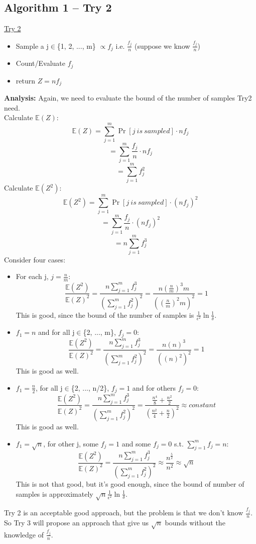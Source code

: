 \documentclass[11pt]{article}
\begin{document}
\subsection{Algorithm 1 -- Try 2}
\begin{mdframed}[backgroundcolor=blue!05,topline=false,bottomline=false,leftline=false,rightline=false] 
	\underline{\sc Try 2}
	\begin{itemize}
		\item Sample a j$\in$\{1, 2, ..., m\} $\propto f_j$ i.e. $\frac{f_j}{n}$ (suppose we know $\frac{f_j}{n}$)
		\item Count/Evaluate $f_j$
		\item return $Z=nf_j$
	\end{itemize}
\end{mdframed}
\textbf{Analysis:} Again, we need to evaluate the bound of the number of samples Try2 need.\\
Calculate $\mathbb{E}(Z)$:
$$\mathbb{E}{(Z)} = \sum_{j=1}^m\Pr[j\ is\ sampled]\cdot nf_j$$
$$= \sum_{j=1}^m \frac{f_j}{n}\cdot nf_j$$
$$= \sum_{j=1}^m f_j^2$$
Calculate $\mathbb{E}(Z^2)$:
$$\mathbb{E}(Z^2)=\sum_{j=1}^m\Pr[j\ is\ sampled]\cdot (nf_j)^2$$
$$= \sum_{j=1}^m \frac{f_j}{n} \cdot (nf_j)^2$$
$$=n\sum_{j=1}^m f_j^3$$
Consider four cases:
\begin{itemize}
    \item For each j, $j =\frac{n}{m}$:
    $$\frac{\mathbb{E}(Z^2)}{\mathbb{E}(Z)^2} = \frac{n\sum_{j=1}^m f_j^3}{(\sum_{j=1}^m f_j^2)^2} = \frac{n(\frac{n}{m})^3m}{((\frac{n}{m})^2 m)^2} = 1$$
    This is good, since the bound of the number of samples is $\frac{1}{\epsilon^2}\ln{\frac{1}{\delta}} $.
    
    \item $f_1=n$ and for all j$\in$\{2, ..., m\}, $f_j=0$:
    $$\frac{\mathbb{E}(Z^2)}{\mathbb{E}(Z)^2} = \frac{n\sum_{j=1}^m f_j^3}{(\sum_{j=1}^m f_j^2)^2} = \frac{n(n)^3}{((n)^2)^2} = 1$$
    This is good as well.
    
    \item $f_1=\frac{n}{2}$, for all j$\in$\{2, ..., n/2\}, $f_j=1$ and for others $f_j=0$:
    $$\frac{\mathbb{E}(Z^2)}{\mathbb{E}(Z)^2} = \frac{n\sum_{j=1}^m f_j^3}{(\sum_{j=1}^m f_j^2)^2} = \frac{\frac{n^4}{8}+\frac{n^2}{2}}{(\frac{n^2}{4}+\frac{n}{2})^2} \approx constant$$
    This is good as well.
    
    \item $f_1=\sqrt{n}$, for other j, some $f_j=1$ and some $f_j=0$ s.t. $\sum_{j=1}^m f_j = n$:
    $$\frac{\mathbb{E}(Z^2)}{\mathbb{E}(Z)^2} = \frac{n\sum_{j=1}^m f_j^3}{(\sum_{j=1}^m f_j^2)^2} \approx \frac{n^{\frac{5}{2}}}{n^2} \approx \sqrt{n}$$
    This is not that good, but it's good enough, since the bound of number of samples is approximately $\sqrt{n}\frac{1}{\epsilon^2}\ln{\frac{1}{\delta}} $.
\end{itemize}
Try 2 is an acceptable good approach, but the problem is that we don't know $\frac{f_j}{n}$. So Try 3 will propose an approach that give us $\sqrt{n}$ bounds without the knowledge of $\frac{f_j}{n}$.
\end{document}
